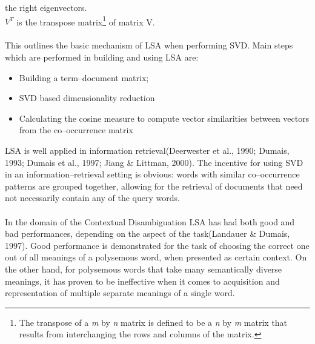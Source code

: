 the right eigenvectors.
\\\textbf{$V^{T}$} is the transpose matrix\footnote{The transpose of a \textit{m} by \textit{n} matrix is 
defined to be a \textit{n} by \textit{m} matrix that results from interchanging the rows and columns of the 
matrix.} of matrix V.
\\\\  This outlines the basic mechanism of LSA when performing SVD. Main steps which are performed in 
building and using LSA are:
\begin{itemize}
\item Building a term--document matrix;

\item SVD based dimensionality reduction
\item Calculating the cosine measure to compute vector similarities between vectors from the co--occurrence matrix 
\end{itemize}
LSA is well applied in information retrieval(Deerwester et al., 1990; Dumais, 1993; Dumais et al., 1997; Jiang \& Littman, 2000). The incentive for using SVD in an information--retrieval setting is obvious: words with similar co--occurrence patterns are grouped together, allowing for the retrieval of documents that need not necessarily contain any of the query words.
\\\\
In the domain of the Contextual Disambiguation LSA has had both good and bad performances, depending on the aspect of the task(Landauer \& Dumais, 1997)\cite{landauerd97}. Good performance is demonstrated for the task of choosing the correct one out of all meanings of a polysemous word, when presented as certain context. On the other hand, for polysemous words that take many semantically diverse meanings, it has proven to be ineffective when it comes to acquisition
and representation of multiple separate meanings of a single word.
\newpage

